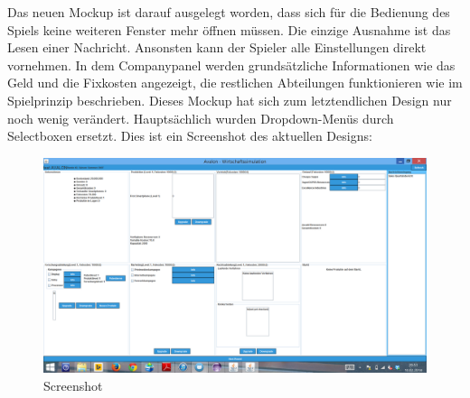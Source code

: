 Das neuen Mockup ist darauf ausgelegt worden, dass sich für die Bedienung des Spiels keine weiteren Fenster mehr öffnen müssen. Die einzige Ausnahme ist das Lesen einer Nachricht. Ansonsten kann der Spieler alle Einstellungen direkt vornehmen. In dem Companypanel werden grundsätzliche Informationen wie das Geld und die Fixkosten angezeigt, die restlichen Abteilungen funktionieren wie im Spielprinzip beschrieben. Dieses Mockup hat sich zum letztendlichen Design nur noch wenig verändert. Hauptsächlich wurden Dropdown-Menüs durch Selectboxen ersetzt.
Dies ist ein Screenshot des aktuellen Designs:

\begin{figure}[H]
\centering
\includegraphics[width=0.7\linewidth]{../images/mockup3}
\caption{Screenshot}
\label{fig:mockup3}
\end{figure}









